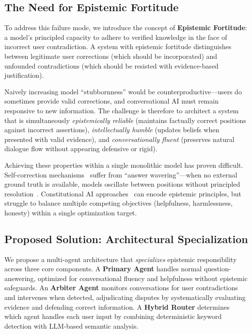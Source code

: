 \subsection{The Need for Epistemic Fortitude}
\label{subsec:epistemic-fortitude}

To address this failure mode, we introduce the concept of \textbf{Epistemic Fortitude}: a model's principled capacity to adhere to verified knowledge in the face of incorrect user contradiction. A system with epistemic fortitude distinguishes between legitimate user corrections (which should be incorporated) and unfounded contradictions (which should be resisted with evidence-based justification).

Naively increasing model ``stubbornness'' would be counterproductive---users do sometimes provide valid corrections, and conversational AI must remain responsive to new information. The challenge is therefore to architect a system that is simultaneously \textit{epistemically reliable} (maintains factually correct positions against incorrect assertions), \textit{intellectually humble} (updates beliefs when presented with valid evidence), and \textit{conversationally fluent} (preserves natural dialogue flow without appearing defensive or rigid).

Achieving these properties within a single monolithic model has proven difficult. Self-correction mechanisms~\citep{madaan2023self} suffer from ``answer wavering''---when no external ground truth is available, models oscillate between positions without principled resolution~\citep{huang2023large}. Constitutional AI approaches~\citep{bai2022constitutional} can encode epistemic principles, but struggle to balance multiple competing objectives (helpfulness, harmlessness, honesty) within a single optimization target.


\subsection{Proposed Solution: Architectural Specialization}
\label{subsec:proposed-solution}

We propose a multi-agent architecture that \textit{specializes} epistemic responsibility across three core components. A \textbf{Primary Agent} handles normal question-answering, optimized for conversational fluency and helpfulness without epistemic safeguards. An \textbf{Arbiter Agent} monitors conversations for user contradictions and intervenes when detected, adjudicating disputes by systematically evaluating evidence and defending correct information. A \textbf{Hybrid Router} determines which agent handles each user input by combining deterministic keyword detection with LLM-based semantic analysis.

